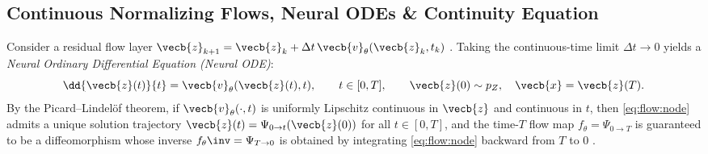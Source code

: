\documentclass[../../../../master.tex]{subfiles}
\begin{document}
\subsection{Continuous Normalizing Flows, Neural ODEs \& Continuity Equation}

Consider a residual flow layer $\vecb{z}_{k+1} = \vecb{z}_k + \Delta t\,\vecb{v}_\theta(\vecb{z}_k, t_k)$ . Taking the continuous-time limit $\Delta t \to 0$ yields a \emph{Neural Ordinary Differential Equation (Neural ODE)}:
\begin{equation}\label{eq:flow:node}
  \dd{\vecb{z}(t)}{t} = \vecb{v}_\theta(\vecb{z}(t), t), \qquad t \in [0, T], \qquad \vecb{z}(0) \sim p_Z, \quad \vecb{x} = \vecb{z}(T).
\end{equation}
By the Picard--Lindel\"of theorem, if $\vecb{v}_\theta(\cdot, t)$ is uniformly Lipschitz continuous in $\vecb{z}$ and continuous in $t$, then \eqref{eq:flow:node} admits a unique solution trajectory $\vecb{z}(t) = \Psi_{0 \to t}(\vecb{z}(0))$ for all $t \in [0, T]$, and the time-$T$ flow map $f_\theta = \Psi_{0 \to T}$ is guaranteed to be a diffeomorphism whose inverse $f_\theta\inv = \Psi_{T \to 0}$ is obtained by integrating \eqref{eq:flow:node} backward from $T$ to $0$ .
\end{document}
